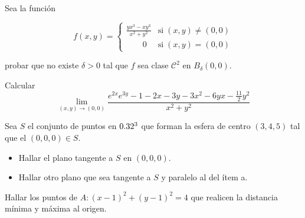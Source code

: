 
\begin{question}
    Sea la función

    \[
        f(x,y) =
        \begin{cases}
            \displaystyle \frac{yx^3-xy^3}{x^2+y^2} & \text{si}\; (x,y) \neq (0,0) \\[10pt]
            \qquad 0                                & \text{si}\; (x,y)=(0,0)
        \end{cases}
    \]

    probar que no existe $\delta>0$ tal que $f$ sea clase $\mathcal{C}^2$ en $B_{\delta}(0,0)$.
\end{question}


\begin{question} Calcular
    \[
        \lim_{(x,y) \to (0,0)}
        \frac{e^{2x}e^{3y} - 1 - 2x -3y - 3x^2 - 6yx - \frac{11}{2}y^2}{x^2+y^2}
    \]
\end{question}


\begin{question}
    Sea $S$ el conjunto de puntos en  $0.32^3$  que forman la esfera de centro $(3,4,5)$ tal que el $(0,0,0) \in S$.
    \begin{itemize}
        \item [a.] Hallar el plano tangente a $S$ en $(0,0,0)$.
        \item [b.] Hallar otro plano que sea tangente a $S$ y paralelo al del ítem a.
    \end{itemize}
\end{question}


\begin{question}
    Hallar los puntos de $A:(x-1)^2 + (y-1)^2 = 4$ que realicen la distancia mínima y máxima al origen.
\end{question}

\newpage

